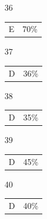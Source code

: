 \documentclass[12pt]{article}
\begin{document}
\begin{multicols}{5}
\begin{enumerate}
\item[]
\item[36] \begin{tabular}{cc} E & 70\%\end{tabular}
\item[37] \begin{tabular}{cc} D & 36\%\end{tabular}
\item[38] \begin{tabular}{cc} D & 35\%\end{tabular}
\item[39] \begin{tabular}{cc} D & 45\%\end{tabular}
\item[40] \begin{tabular}{cc} D & 40\%\end{tabular}

\item[]


\end{enumerate}
\end{multicols}
\end{document}

